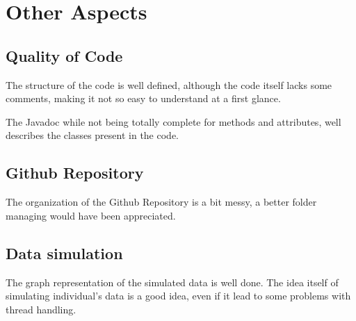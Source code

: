 \section{Other Aspects}



\subsection{Quality of Code}

The structure of the code is well defined, although the code itself lacks some comments, making it not so easy to understand at a first glance. 

The Javadoc while not being totally complete for methods and attributes, well describes the classes present in the code.


\subsection{Github Repository}

The organization of the Github Repository is a bit messy, a better folder managing would have been appreciated.


\subsection{Data simulation}

The graph representation of the simulated data is well done. The idea itself of simulating individual's data is a good idea, even if it lead to some problems with thread handling.



